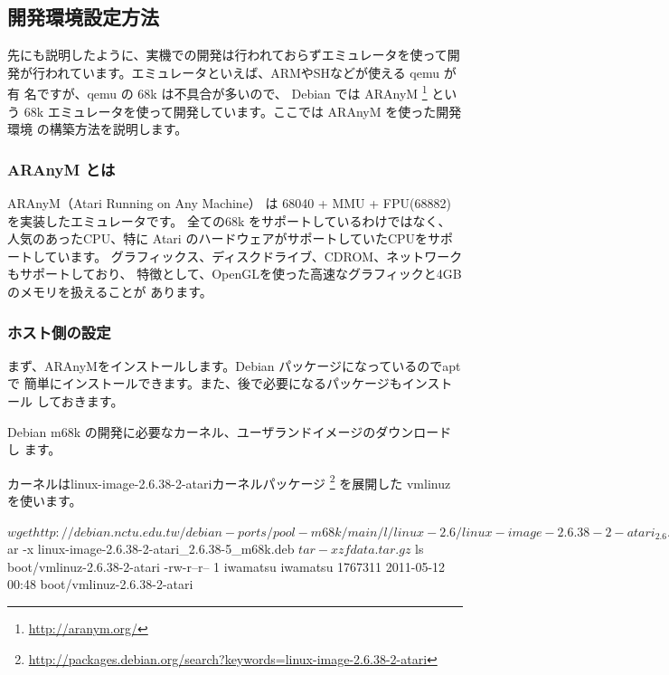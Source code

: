 \documentclass[mingoth,a4paper]{jsarticle}
\begin{document}
\subsection{開発環境設定方法}

先にも説明したように、実機での開発は行われておらずエミュレータを使って開
発が行われています。エミュレータといえば、ARMやSHなどが使える qemu が有
名ですが、qemu の 68k は不具合が多いので、
Debian では ARAnyM \footnote{\url{http://aranym.org/}}
という 68k エミュレータを使って開発しています。ここでは ARAnyM を使った開発環境
の構築方法を説明します。

\subsubsection{ARAnyM とは}

ARAnyM（Atari Running on Any Machine） は 68040 + MMU + FPU(68882) を実装したエミュレータです。
全ての68k をサポートしているわけではなく、人気のあったCPU、特に
Atari のハードウェアがサポートしていたCPUをサポートしています。
グラフィックス、ディスクドライブ、CDROM、ネットワークもサポートしており、
特徴として、OpenGLを使った高速なグラフィックと4GB のメモリを扱えることが
あります。

\subsubsection{ホスト側の設定}
まず、ARAnyMをインストールします。Debian パッケージになっているのでaptで
簡単にインストールできます。また、後で必要になるパッケージもインストール
しておきます。


Debian m68k の開発に必要なカーネル、ユーザランドイメージのダウンロードし
ます。

カーネルはlinux-image-2.6.38-2-atariカーネルパッケージ
\footnote{\url{http://packages.debian.org/search?keywords=linux-image-2.6.38-2-atari}}
を展開した vmlinuz を使います。

\begin{commandline}
$ wget http://debian.nctu.edu.tw/debian-ports/pool-m68k/main/l/linux-2.6/linux-image-2.6.38-2-atari_2.6.38-5_m68k.deb
$ ar -x linux-image-2.6.38-2-atari_2.6.38-5_m68k.deb
$ tar -xzf data.tar.gz
$ ls boot/vmlinuz-2.6.38-2-atari
-rw-r--r-- 1 iwamatsu iwamatsu 1767311 2011-05-12 00:48 boot/vmlinuz-2.6.38-2-atari
\end{commandline}
\end{document}
